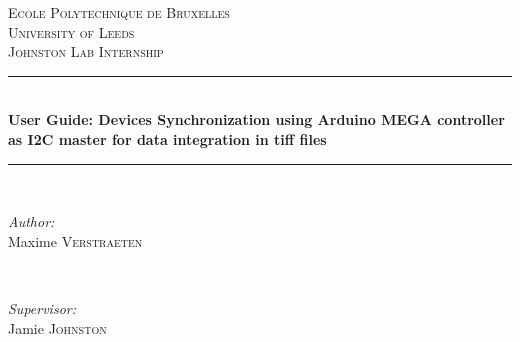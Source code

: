\documentclass[a4paper]{article}
\begin{document}
\begin{titlepage}

\newcommand{\HRule}{\rule{\linewidth}{0.5mm}} %

\center %
 

\textsc{\LARGE Ecole Polytechnique de Bruxelles}\\[1.5cm] %
\textsc{\LARGE University of Leeds}\\[1.5cm]
\textsc{\large Johnston Lab Internship}\\[0.5cm] %


\HRule \\[0.4cm]
{ \huge \bfseries User Guide: Devices Synchronization using Arduino MEGA controller as I2C master for data integration in tiff files}\\[0.4cm] %
\HRule \\[1.5cm]
 

\begin{minipage}{0.4\textwidth}
\begin{flushleft} \large
\emph{Author:}\\
Maxime \textsc{Verstraeten} %
\end{flushleft}
\end{minipage}
~
\begin{minipage}{0.4\textwidth}
\begin{flushright} \large
\emph{Supervisor:} \\
Jamie \textsc{Johnston}\\[0.3cm] %
\end{flushright}
\end{minipage}\\[2cm]


\end{titlepage}
\end{document}
